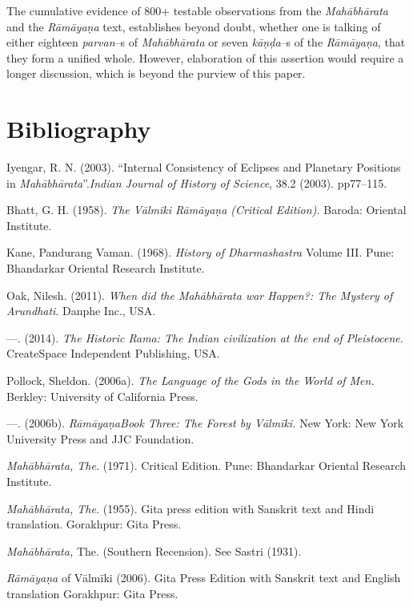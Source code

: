 The cumulative evidence of 800+ testable observations from the \textit{Mahābhārata} and the \textit{Rāmāyaṇa} text, establishes beyond doubt, whether one is talking of either eighteen \textit{parvan}–s of \textit{Mahābhārata} or seven \textit{kāṇḍa}–s of the \textit{Rāmāyaṇa}, that they form a unified whole. However, elaboration of this assertion would require a longer discussion, which is beyond the purview of this paper.


\section*{Bibliography}

\begin{thebibliography}{99}
\itemsep=1pt
 Iyengar, R. N. (2003). “Internal Consistency of Eclipses and Planetary Positions in \textit{Mahābhārata}”.\textit{Indian Journal of History of Science}, 38.2 (2003). pp77–115.

  Bhatt, G. H. (1958). \textit{The Vālmīki Rāmāyaṇa (Critical Edition).} Baroda: Oriental Institute.

  Kane, Pandurang Vaman. (1968). \textit{History of Dharmashastra} Volume III. Pune: Bhandarkar Oriental Research Institute.

  Oak, Nilesh. (2011). \textit{When did the Mahābhārata war Happen?: The Mystery of Arundhati}. Danphe Inc., USA.

  —. (2014). \textit{The Historic Rama: The Indian civilization at the end of Pleistocene}. CreateSpace Independent Publishing, USA.

  Pollock, Sheldon. (2006a). \textit{The Language of the Gods in the World of Men.} Berkley: University of California Press.

  —. (2006b). \textit{Rāmāyaṇa}\textit{Book Three: The Forest by Vālmīki.} New York: New York University Press and JJC Foundation.

  \textit{Mahābhārata, The.} (1971). Critical Edition. Pune: Bhandarkar Oriental Research Institute.

  \textit{Mahābhārata, The.} (1955). Gita press edition with Sanskrit text and Hindi translation. Gorakhpur: Gita Press.

  \textit{Mahābhārata,} The. (Southern Recension). See Sastri (1931).

  \textit{Rāmāyaṇa} of Vālmīki (2006). Gita Press Edition with Sanskrit text and English translation Gorakhpur: Gita Press.


\end{thebibliography}
